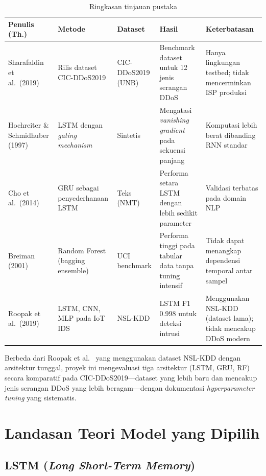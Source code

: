 \documentclass[11pt,a4paper,oneside]{report}
\begin{document}
\begin{table}[h!]
\centering
\caption{Ringkasan tinjauan pustaka}
\label{tab:related-work}
\begin{tabularx}{\textwidth}{p{3.2cm}p{2.8cm}p{2.2cm}p{2.5cm}p{2.5cm}}
\toprule
\textbf{Penulis (Th.)} & \textbf{Metode} & \textbf{Dataset} & \textbf{Hasil} & \textbf{Keterbatasan} \\
\midrule
Sharafaldin et al.\ (2019)~\cite{sharafaldin2019} & Rilis dataset CIC-DDoS2019 & CIC-DDoS2019 (UNB) & Benchmark dataset untuk 12 jenis serangan DDoS & Hanya lingkungan testbed; tidak mencerminkan ISP produksi \\
\addlinespace
Hochreiter \& Schmidhuber (1997)~\cite{hochreiter1997} & LSTM dengan \textit{gating mechanism} & Sintetis & Mengatasi \textit{vanishing gradient} pada sekuensi panjang & Komputasi lebih berat dibanding RNN standar \\
\addlinespace
Cho et al.\ (2014)~\cite{cho2014} & GRU sebagai penyederhanaan LSTM & Teks (NMT) & Performa setara LSTM dengan lebih sedikit parameter & Validasi terbatas pada domain NLP \\
\addlinespace
Breiman (2001)~\cite{breiman2001} & Random Forest (bagging ensemble) & UCI benchmark & Performa tinggi pada tabular data tanpa tuning intensif & Tidak dapat menangkap dependensi temporal antar sampel \\
\addlinespace
Roopak et al.\ (2019)~\cite{roopak2019} & LSTM, CNN, MLP pada IoT IDS & NSL-KDD & LSTM F1 0.998 untuk deteksi intrusi & Menggunakan NSL-KDD (dataset lama); tidak mencakup DDoS modern \\
\bottomrule
\end{tabularx}
\end{table}

Berbeda dari Roopak et al.~\cite{roopak2019} yang menggunakan dataset NSL-KDD dengan arsitektur tunggal, proyek ini mengevaluasi tiga arsitektur (LSTM, GRU, RF) secara komparatif pada CIC-DDoS2019---dataset yang lebih baru dan mencakup jenis serangan DDoS yang lebih beragam---dengan dokumentasi \textit{hyperparameter tuning} yang sistematis.

\section{Landasan Teori Model yang Dipilih}

\subsection*{LSTM (\textit{Long Short-Term Memory})}
\end{document}
